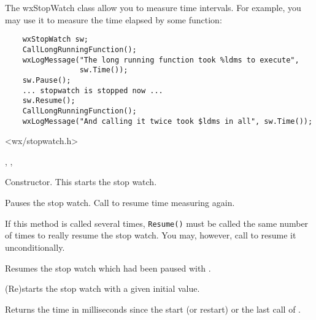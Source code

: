 \section{}\label{wxstopwatch}

The wxStopWatch class allow you to measure time intervals. For example, you may
use it to measure the time elapsed by some function:

\begin{verbatim}
    wxStopWatch sw;
    CallLongRunningFunction();
    wxLogMessage("The long running function took %ldms to execute",
                 sw.Time());
    sw.Pause();
    ... stopwatch is stopped now ...
    sw.Resume();
    CallLongRunningFunction();
    wxLogMessage("And calling it twice took $ldms in all", sw.Time());
\end{verbatim}


<wx/stopwatch.h>


, , 


\label{wxstopwatchctor}


Constructor. This starts the stop watch.

\label{wxstopwatchpause}


Pauses the stop watch. Call  to resume 
time measuring again.

If this method is called several times, {\tt Resume()} must be called the same
number of times to really resume the stop watch. You may, however, call 
 to resume it unconditionally.

\label{wxstopwatchresume}


Resumes the stop watch which had been paused with 
.

\label{wxstopwatchstart}


(Re)starts the stop watch with a given initial value.

\label{wxstopwatchtime}

\label{wxstopwatchtime}

Returns the time in milliseconds since the start (or restart) or the last call of 
.

